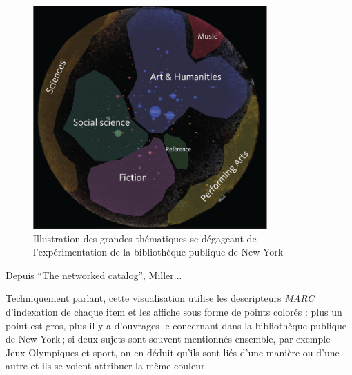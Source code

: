 \begin{figure}[h!]
	\centering
	\includegraphics[width=0.8\textwidth]{images/image12.png}
	\caption{Illustration des grandes thématiques se dégageant de l'expérimentation de la bibliothèque publique de New York}
	\label{fig:image12}
\end{figure}

\begin{center}
	Depuis \enquote{The networked catalog}, Miller...
\end{center}


Techniquement parlant, cette visualisation utilise les descripteurs \textit{MARC} d’indexation de chaque item et les affiche sous forme de points colorés : plus un point est gros, plus il y a d’ouvrages le concernant dans la bibliothèque publique de New York ; si deux sujets sont souvent mentionnés ensemble, par exemple Jeux-Olympiques et sport, on en déduit qu’ils sont liés d’une manière ou d’une autre et ils se voient attribuer la même couleur.

